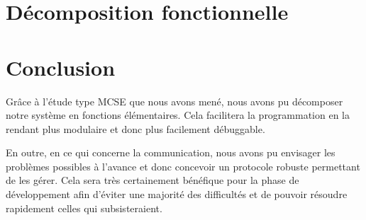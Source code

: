 \documentclass[11pt,french]{article} %
\begin{document}
\section{Décomposition fonctionnelle}

\begin{center}
\begin{turn}{90}

\end{turn}
\end{center}

\pagebreak

\setcounter{section}{0}

\section*{Conclusion}

Grâce à l'étude type MCSE que nous avons mené, nous avons pu décomposer notre système en fonctions élémentaires. Cela facilitera la programmation en la rendant plus modulaire et donc plus facilement débuggable.  

\vspace{0.2cm}

En outre, en ce qui concerne la communication, nous avons pu envisager les problèmes possibles à l'avance et donc concevoir un protocole robuste permettant de les gérer. Cela sera très certainement bénéfique pour la phase de développement afin d'éviter une majorité des difficultés et de pouvoir résoudre rapidement celles qui subsisteraient.  
\end{document}
